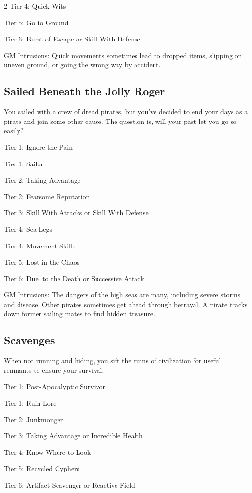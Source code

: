 \begin{multicols}{2}
Tier 4: Quick Wits

Tier 5: Go to Ground

Tier 6: Burst of Escape or Skill With Defense

GM Intrusions: Quick movements sometimes lead to dropped items, slipping on uneven ground, or going the wrong way by accident.

\subsection{Sailed Beneath the Jolly Roger}

You sailed with a crew of dread pirates, but you’ve decided to end your days as a pirate and join some other cause. The question is, will your past let you go so easily?

Tier 1: Ignore the Pain

Tier 1: Sailor

Tier 2: Taking Advantage

Tier 2: Fearsome Reputation

Tier 3: Skill With Attacks or Skill With Defense

Tier 4: Sea Legs

Tier 4: Movement Skills

Tier 5: Lost in the Chaos

Tier 6: Duel to the Death or Successive Attack

GM Intrusions: The dangers of the high seas are many, including severe storms and disease. Other pirates sometimes get ahead through betrayal. A pirate tracks down former sailing mates to find hidden treasure.

\subsection{Scavenges}

When not running and hiding, you sift the ruins of civilization for useful remnants to ensure your survival.

Tier 1: Post-Apocalyptic Survivor

Tier 1: Ruin Lore

Tier 2: Junkmonger

Tier 3: Taking Advantage or Incredible Health

Tier 4: Know Where to Look

Tier 5: Recycled Cyphers

Tier 6: Artifact Scavenger or Reactive Field


\end{multicols}
